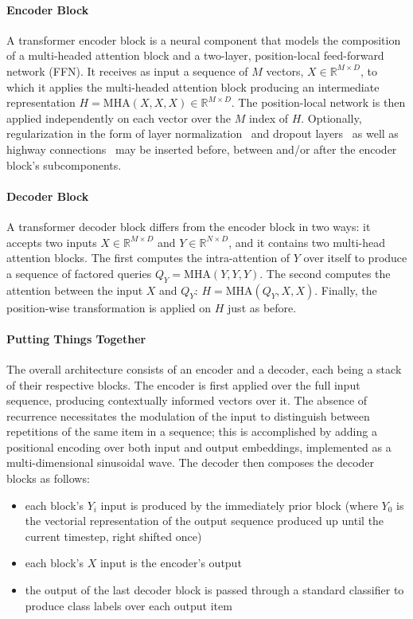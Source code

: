 \paragraph{Encoder Block} A transformer encoder block is a neural component that models the composition of a multi-headed attention block and a two-layer, position-local feed-forward network (FFN).
It receives as input a sequence of $M$ vectors, $X \in \mathbb{R}^{M\times D}$, to which it applies the multi-headed attention block producing an intermediate representation $H = \text{MHA}(X, X, X) \in \mathbb{R}^{M \times D}$.
The position-local network is then applied independently on each vector over the $M$ index of $H$.
Optionally, regularization in the form of layer normalization~\cite{lei2016layer} and dropout layers~\cite{hinton2012improving} as well as highway connections~\cite{srivastava2015highway} may be inserted before, between and/or after the encoder block's subcomponents.

\paragraph{Decoder Block} A transformer decoder block differs from the encoder block in two ways: it accepts two inputs $X \in \mathbb{R}^{M \times D}$ and $Y \in \mathbb{R}^{N\times D}$, and it contains two multi-head attention blocks.
The first computes the intra-attention of $Y$ over itself to produce a sequence of factored queries $Q_Y = \text{MHA}(Y, Y, Y)$.
The second computes the attention between the input $X$ and $Q_Y$: $H = \text{MHA}(Q_Y, X, X)$.
Finally, the position-wise transformation is applied on $H$ just as before.

\paragraph{Putting Things Together}
The overall architecture consists of an encoder and a decoder, each being a stack of their respective blocks.
The encoder is first applied over the full input sequence, producing contextually informed vectors over it.
The absence of recurrence necessitates the modulation of the input to distinguish between repetitions of the same item in a sequence; this is accomplished by adding a positional encoding over both input and output embeddings, implemented as a multi-dimensional sinusoidal wave.
The decoder then composes the decoder blocks as follows:
\begin{itemize}
    \item each block's $Y_i$ input is produced by the immediately prior block (where $Y_0$ is the vectorial representation of the output sequence produced up until the current timestep, right shifted once)
    \item each block's $X$ input is the encoder's output
    \item the output of the last decoder block is passed through a standard classifier to produce class labels over each output item
\end{itemize}

